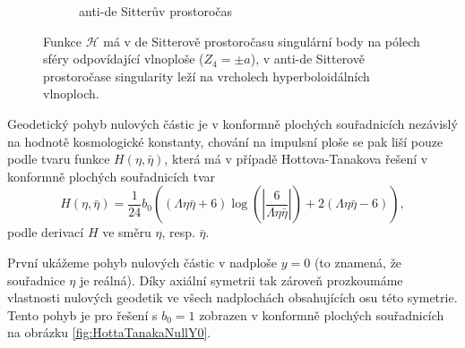 \begin{figure}[ht]
\begin{subfigure}[b]{0.45\textwidth}
\begin{tikzpicture}
        \end{tikzpicture}
        \caption{anti-de Sitterův prostoročas}
    \end{subfigure}
    \caption{Funkce $\mathcal{H}$ má v de Sitterově prostoročasu singulární body na pólech sféry odpovídající vlnoploše ($Z_4 = \pm a$), v anti-de Sitterově
    prostoročase singularity leží na vrcholech hyperboloidálních vlnoploch.}
    \label{fig:funkceHhodnotyvADS}
\end{figure}

Geodetický pohyb nulových částic je v konformně plochých souřadnicích
nezávislý na hodnotě kosmologické konstanty, chování na impulsní ploše se pak liší pouze podle tvaru funkce $H(\eta, \bar{\eta})$, která má v případě Hottova-Tanakova řešení
v konformně plochých souřadnicích tvar
\begin{equation}
    \label{eq:Hotta_Tanaka_H_conf_flat_coords}
    H(\eta, \bar{\eta}) = \frac{1}{24} b_0 \left((\Lambda \eta \bar{\eta} + 6) \log \left(\left| \frac{6}{\Lambda \eta \bar{\eta} }\right| \right)+2 (\Lambda \eta \bar{\eta} - 6)\right),
\end{equation}
 podle derivací $H$ ve směru $\eta$, resp. $\bar{\eta}$.

První ukážeme pohyb nulových částic v nadploše $y=0$ (to znamená, že souřadnice $\eta$ je reálná). Díky axiální symetrii tak zároveň prozkoumáme
vlastnosti nulových geodetik ve všech nadplochách obsahujících osu této symetrie.
Tento pohyb je pro řešení s $b_0 = 1$ zobrazen v konformně plochých souřadnicích  na obrázku \ref{fig:HottaTanakaNullY0}.

